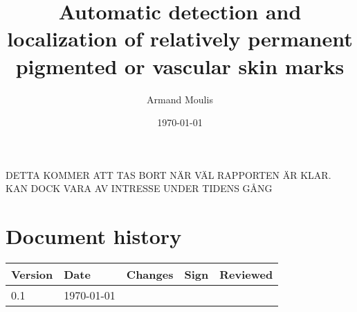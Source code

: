 \documentclass{article}
\begin{document}
	
	
\title{Automatic detection and localization of relatively permanent pigmented or vascular skin marks}
\author{Armand Moulis}
\date{\today}
\maketitle

\newpage

\listoffigures

\listoftables

\newpage

\setcounter{tocdepth}{3}
\tableofcontents

\newpage

DETTA KOMMER ATT TAS BORT NÄR VÄL RAPPORTEN ÄR KLAR. KAN DOCK VARA AV INTRESSE UNDER TIDENS GÅNG 
\section*{Document history}
\begin{center}
	\begin{tabular}{|l|l| p{5cm} |l|l| }
		\hline
		Version & Date   & Changes & Sign & Reviewed \\ \hline
		0.1     & \today &         &      &  \\ \hline
	\end{tabular}
\end{center}





\setcounter{page}{1}
\newpage
















	
\newpage

	
	
\end{document}
